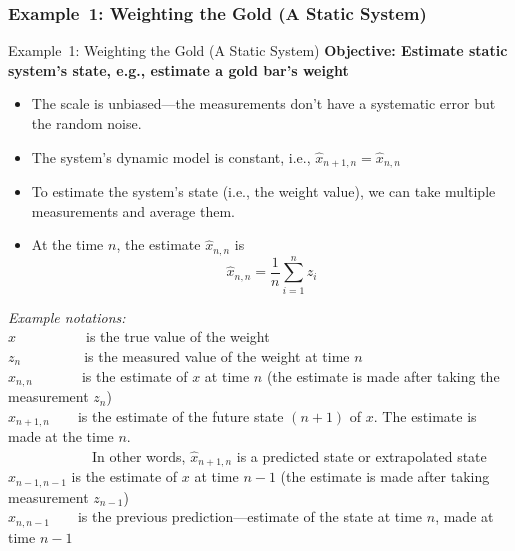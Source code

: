 \subsubsection{Example~1: Weighting the Gold (A Static System)}
\begin{frame}{Example~1: Weighting the Gold (A Static System)}
    \textbf{Objective: Estimate static system's state, e.g., estimate a gold bar's weight}\\
    \begin{itemize}
        \item The scale is unbiased---the measurements don't have a systematic error but the random noise.
        \item The system's dynamic model is constant, i.e., $\boxed{\hat{x}_{n+1,n} = \hat{x}_{n,n}}$
        \item To estimate the system's state (i.e., the weight value), we can take multiple measurements and average them. 
        \item At the time $n$, the estimate $\hat{x}_{n,n}$ is
        $$\hat{x}_{n,n} = \frac{1}{n}\sum_{i=1}^n z_i$$
    \end{itemize}
        \textit{Example notations:}\\ 
        $x$~~~~~~~~~~is the true value of the weight\\
        $z_n$~~~~~~~~~is the measured value of the weight at time $n$\\
        $\hat{x}_{n,n}$~~~~~~~is the estimate of $x$ at time $n$ (the estimate is made after taking the measurement $z_n$)\\
        $\hat{x}_{n+1,n}$~~~~is the estimate of the future state $(n+1)$ of $x$. The estimate is made at the time $n$. \\~~~~~~~~~~~~In other words, $\hat{x}_{n+1,n}$ is a predicted state or extrapolated state\\
        $\hat{x}_{n-1,n-1}$ is the estimate of $x$ at time $n-1$ (the estimate is made after taking measurement $z_{n-1}$)\\
        $\hat{x}_{n,n-1}$~~~~is the previous prediction---estimate of the state at time $n$, made at time $n-1$\\
\end{frame}
